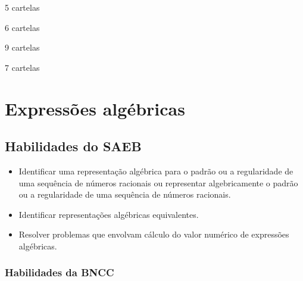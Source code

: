 \begin{escolha}[itemsep=0pt]
\item 5 cartelas
\item 6 cartelas
\item 9 cartelas
\item 7 cartelas
\end{escolha}




\chapter{Expressões algébricas}

\section*{Habilidades do SAEB }
\begin{itemize}
\item Identificar uma representação algébrica para o
padrão ou a regularidade de uma sequência de números racionais ou
representar algebricamente o padrão ou a regularidade de uma sequência
de números racionais.
\item
  Identificar representações algébricas equivalentes.
\item
  Resolver problemas que envolvam cálculo do valor numérico de
  expressões algébricas.
\end{itemize}

\subsection{Habilidades da BNCC}

